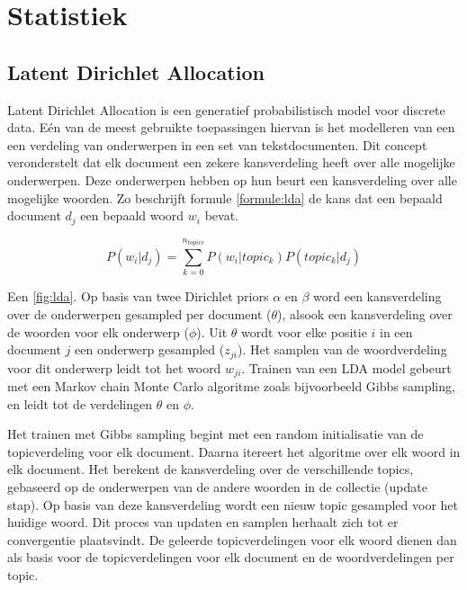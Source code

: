 \section{Statistiek}

\subsection{Latent Dirichlet Allocation}
Latent Dirichlet Allocation\cite{Blei2012} is een generatief probabilistisch model voor discrete data. E\'en van de meest gebruikte toepassingen hiervan is het modelleren van een een verdeling van onderwerpen in een set van tekstdocumenten. Dit concept veronderstelt dat elk document een zekere kansverdeling heeft over alle mogelijke onderwerpen. Deze onderwerpen hebben op hun beurt een kansverdeling over alle mogelijke woorden. Zo beschrijft formule \ref{formule:lda} de kans dat een bepaald document $d_j$ een bepaald woord $w_i$ bevat. 

\begin{equation}
    P(w_i | d_j) = \sum\limits_{k=0}^{n_{topics}}P(w_i|topic_k)P(topic_k|d_j)
    \label{formule:lda}
\end{equation}

Een  \ref{fig:lda}. Op basis van twee Dirichlet priors $\alpha$ en $\beta$ word een kansverdeling over de onderwerpen gesampled per document ($\theta$), alsook een kansverdeling over de woorden voor elk onderwerp ($\phi$). Uit $\theta$ wordt voor elke positie $i$ in een document $j$ een onderwerp gesampled ($z_{ji}$). Het samplen van de woordverdeling voor dit onderwerp leidt tot het woord $w_{ji}$. Trainen van een LDA model gebeurt met een Markov chain Monte Carlo algoritme zoals bijvoorbeeld Gibbs sampling, en leidt tot de verdelingen $\theta$ en $\phi$. 

Het trainen met Gibbs sampling begint met een random initialisatie van de topicverdeling voor elk document. Daarna itereert het algoritme over elk woord in elk document. Het berekent de kansverdeling over de verschillende topics, gebaseerd op de onderwerpen van de andere woorden in de collectie (update stap). Op basis van deze kansverdeling wordt een nieuw topic gesampled voor het huidige woord. Dit proces van updaten en samplen herhaalt zich tot er convergentie plaatsvindt. De geleerde topicverdelingen voor elk woord dienen dan als basis voor de topicverdelingen voor elk document en de woordverdelingen per topic. 

